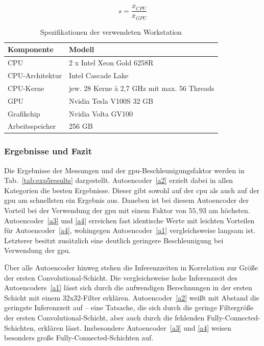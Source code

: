 \begin{equation}
    s = \frac{\overline{x}_{CPU}}{\overline{x}_{GPU}}
\end{equation}

\begin{table}[t]
    \centering
    \caption{Spezifikationen der verwendeten Workstation}
    \label{tab:workstation}
    \smallskip
    \begin{tabularx}{8.3cm}{ lX }
        \toprule
        Komponente & Modell \\
        \hline
        CPU & 2 x Intel Xeon Gold 6258R \\
        CPU-Architektur & Intel Cascade Lake \\
        CPU-Kerne & jew. 28 Kerne à 2,7 GHz mit max. 56 Threads \\
        GPU & Nvidia Tesla V100S 32 GB \\
        Grafikchip & Nvidia Volta GV100 \\
        Arbeitsspeicher & 256 GB \\
        \bottomrule
    \end{tabularx}
\end{table}

\subsubsection*{Ergebnisse und Fazit}
Die Ergebnisse der Messungen und der \gls{gpu}-Beschleunigungsfaktor werden in Tab.~\ref{tab:exp5results} dargestellt. Autoencoder~\ref{a2} erzielt dabei in allen Kategorien die besten Ergebnisse. Dieser gibt sowohl auf der \gls{cpu} als auch auf der \gls{gpu} am schnellsten ein Ergebnis aus. Daneben ist bei diesem Autoencoder der Vorteil bei der Verwendung der \gls{gpu} mit einem Faktor von $55,93$ am höchsten. Autoencoder~\ref{a3} und \ref{a4} erreichen fast identische Werte mit leichten Vorteilen für Autoencoder~\ref{a4}, wohingegen Autoencoder~\ref{a1} vergleichsweise langsam ist. Letzterer besitzt zusätzlich eine deutlich geringere Beschleunigung bei Verwendung der \gls{gpu}.

Über alle Autoencoder hinweg stehen die Inferenzzeiten in Korrelation zur Größe der ersten Convolutional-Schicht. Die vergleichsweise hohe Inferenzzeit des Autoencoders~\ref{a1} lässt sich durch die aufwendigen Berechnungen in der ersten Schicht mit einem 32x32-Filter erklären. Autoencoder~\ref{a2} weißt mit Abstand die geringste Inferenzzeit auf -- eine Tatsache, die sich durch die geringe Filtergröße der ersten Convolutional-Schicht, aber auch durch die fehlenden Fully-Connected-Schichten, erklären lässt. Insbesondere Autoencoder~\ref{a3} und \ref{a4} weisen besonders große Fully-Connected-Schichten auf.

